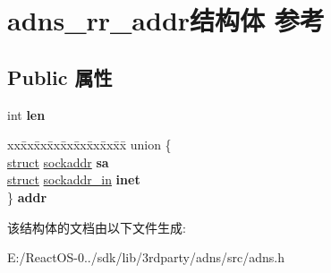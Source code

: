 \hypertarget{structadns__rr__addr}{}\section{adns\+\_\+rr\+\_\+addr结构体 参考}
\label{structadns__rr__addr}
\subsection*{Public 属性}
\begin{DoxyCompactItemize}
\item 
\mbox{\label{structadns__rr__addr_ab1d5b18048d1cf0f48da3bf561d63510}} 
int {\bfseries len}
\item 
\mbox{\label{structadns__rr__addr_a7c47d47c20917c1b92ed6fec06b5f4c2}} 
\begin{tabbing}
xx\=xx\=xx\=xx\=xx\=xx\=xx\=xx\=xx\=\kill
union \{\\
\>\hyperlink{interfacestruct}{struct} \hyperlink{structsockaddr}{sockaddr} {\bfseries sa}\\
\>\hyperlink{interfacestruct}{struct} \hyperlink{structsockaddr__in}{sockaddr\_in} {\bfseries inet}\\
\} {\bfseries addr}\\

\end{tabbing}\end{DoxyCompactItemize}


该结构体的文档由以下文件生成\+:\begin{DoxyCompactItemize}
\item 
E\+:/\+React\+O\+S-\/0../sdk/lib/3rdparty/adns/src/adns.\+h\end{DoxyCompactItemize}
